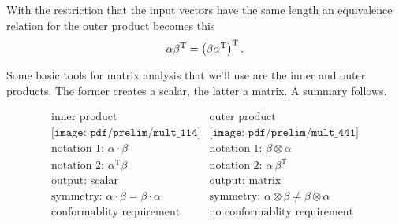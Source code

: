 With the restriction that the input vectors have the same length an equivalence relation for the outer product becomes this
\begin{equation}
  \alpha \beta^{\mathrm{T}} = \left( \beta \alpha^{\mathrm{T}} \right)^{\mathrm{T}}.
\end{equation}

Some basic tools for matrix analysis that we'll use are the inner and outer products. The former creates a scalar, the latter a matrix. A summary follows.

$$
\boxed{
\begin{array}{c|c}
\text{inner product}  & \text{outer product}\\\hline\hline
\texttt{[image: pdf/prelim/mult\_114]}&
\texttt{[image: pdf/prelim/mult\_441]}\\\hline\hline
\text{notation 1: } \alpha \cdot \beta & \text{notation 1: } \beta \otimes \alpha\\
\text{notation 2: }\alpha^{\mathrm{T}}\beta & \text{notation 2: } \alpha\,\beta^{\mathrm{T}} \\
\text{output: scalar} & \text{output: matrix}\\
\text{symmetry: } \alpha \cdot \beta = \beta \cdot \alpha & \text{symmetry: } \alpha \otimes \beta \ne \beta \otimes \alpha\\
\text{conformablity requirement} & \text{no conformablity requirement}\\
\end{array}
}
$$

\endinput